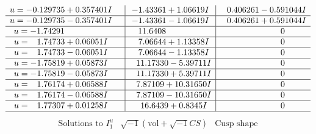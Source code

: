 \documentclass[1p]{elsarticle_modified}
\theoremstyle{definition}
\newcommand{\I}{\sqrt{-1}}
\begin{document}
$$\begin{array}{c|c|c}
\begin{aligned}
u &= -0.129735 + 0.357401 I\end{aligned}
 & -1.43361 + 1.06619 I & \phantom{-}0.406261 - 0.591044 I \\ \hline\begin{aligned}
u &= -0.129735 - 0.357401 I\end{aligned}
 & -1.43361 - 1.06619 I & \phantom{-}0.406261 + 0.591044 I \\ \hline\begin{aligned}
u &= -1.74291\phantom{ +0.000000I}\end{aligned}
 & \phantom{-}11.6408\phantom{ +0.000000I} & \phantom{-0.000000 } 0 \\ \hline\begin{aligned}
u &= \phantom{-}1.74733 + 0.06051 I\end{aligned}
 & \phantom{-}7.06644 + 1.13358 I & \phantom{-0.000000 } 0 \\ \hline\begin{aligned}
u &= \phantom{-}1.74733 - 0.06051 I\end{aligned}
 & \phantom{-}7.06644 - 1.13358 I & \phantom{-0.000000 } 0 \\ \hline\begin{aligned}
u &= -1.75819 + 0.05873 I\end{aligned}
 & \phantom{-}11.17330 - 5.39711 I & \phantom{-0.000000 } 0 \\ \hline\begin{aligned}
u &= -1.75819 - 0.05873 I\end{aligned}
 & \phantom{-}11.17330 + 5.39711 I & \phantom{-0.000000 } 0 \\ \hline\begin{aligned}
u &= \phantom{-}1.76174 + 0.06588 I\end{aligned}
 & \phantom{-}7.87109 + 10.31650 I & \phantom{-0.000000 } 0 \\ \hline\begin{aligned}
u &= \phantom{-}1.76174 - 0.06588 I\end{aligned}
 & \phantom{-}7.87109 - 10.31650 I & \phantom{-0.000000 } 0 \\ \hline\begin{aligned}
u &= \phantom{-}1.77307 + 0.01258 I\end{aligned}
 & \phantom{-}16.6439 + 0.8345 I & \phantom{-0.000000 } 0\\
 \hline 
 \end{array}$$\newpage$$\begin{array}{c|c|c}  
\text{Solutions to }I^u_{1}& \I (\text{vol} + \sqrt{-1}CS) & \text{Cusp shape}\\

\end{array}$$
\end{document}
